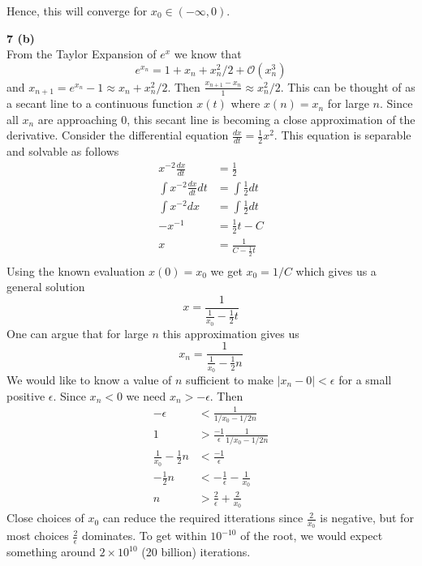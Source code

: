 \documentclass[12pt]{article}
\newcommand{\problem}[1]{\hspace{-4 ex} \large \textbf{#1}\\}
\begin{document}
	Hence, this will converge for $x_0 \in (-\infty,0)$.
	
\problem{7 (b)}
	From the Taylor Expansion of $e^x$ we know that 
	$$e^{x_n} =  1 + x_n + x_n^2/2 + \mathcal{O}(x_n^3)$$
	and $x_{n+1} = e^{x_n}-1 \approx x_n + x_n^2/2$. Then $\frac{x_{n+1} - x_n}{1} \approx x_n^2/2$. This can be thought of as a secant line to a continuous function $x(t)$ where $x(n) = x_n$ for large $n$. Since all $x_n$ are approaching $0$, this secant line is becoming a close approximation of the derivative. Consider the differential equation $\frac{dx}{dt} = \frac{1}{2}x^2$. This equation is separable and solvable as follows
	\begin{align*}
		x^{-2}\frac{dx}{dt} & = \frac{1}{2} \\
		\int x^{-2}\frac{dx}{dt} dt & = \int \frac{1}{2} dt \\
		\int x^{-2}dx & = \int \frac{1}{2} dt \\
		-x^{-1} & = \frac{1}{2}t - C \\
		x & = \frac{1}{C - \frac{1}{2}t} \\
	\end{align*}
	Using the known evaluation $x(0)=x_0$ we get $x_0=1/C$ which gives us a general solution
	$$
	x = \frac{1}{\frac{1}{x_0} - \frac{1}{2}t}
	$$
	One can argue that for large $n$ this approximation gives us 
	$$x_n = \frac{1}{\frac{1}{x_0} - \frac{1}{2}n}$$
	We would like to know a value of $n$ sufficient to make $\vert x_n-0\vert < \epsilon$ for a small positive $\epsilon$. Since $x_n<0$ we need $x_n>-\epsilon$. Then
	\begin{align*}
		-\epsilon &< \frac{1}{1/x_0 - 1/2n} \\
		1 & > \frac{-1}{\epsilon} \frac{1}{1/x_0 - 1/2n} \\
		\frac{1}{x_0} - \frac{1}{2}n & < \frac{-1}{\epsilon}\\
		- \frac{1}{2}n & < -\frac{1}{\epsilon} - \frac{1}{x_0}\\
		n & > \frac{2}{\epsilon} + \frac{2}{x_0}
	\end{align*}
	Close choices of $x_0$ can reduce the required itterations since $\frac{2}{x_0}$ is negative, but for most choices  $\frac{2}{\epsilon}$ dominates. To get within $10^{-10}$ of the root, we would expect something around $2 \times 10^{10}$ (20 billion) iterations.
	
\end{document}
